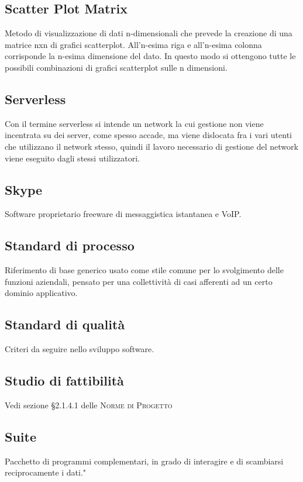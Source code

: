 \documentclass[../glossario.tex]{subfiles}
\begin{document}
\subsection*{Scatter Plot Matrix}
Metodo di visualizzazione di dati n-dimensionali che prevede la creazione di una matrice nxn di grafici scatterplot. All’n-esima riga e all’n-esima colonna corrisponde la n-esima dimensione del dato. In questo modo si ottengono tutte le possibili combinazioni di grafici scatterplot sulle n dimensioni.

\subsection*{Serverless} 
Con il termine serverless si intende un network la cui gestione non viene incentrata su dei server, come spesso accade, ma viene dislocata fra i vari utenti che utilizzano il network stesso, quindi il lavoro necessario di gestione del network viene eseguito dagli stessi utilizzatori.

\subsection*{Skype} 
Software proprietario freeware di messaggistica istantanea e VoIP.

\subsection*{Standard di processo} 
Riferimento di base generico usato come stile comune per lo svolgimento delle funzioni aziendali, pensato per una collettività di casi afferenti ad un certo dominio applicativo.

\subsection*{Standard di qualità} 
Criteri da seguire nello sviluppo software.

\subsection*{Studio di fattibilità}
Vedi sezione \S2.1.4.1 delle \textsc{Norme di Progetto}

\subsection*{Suite} 
Pacchetto di programmi complementari, in grado di interagire e di scambiarsi reciprocamente i dati."

    
\end{document}
